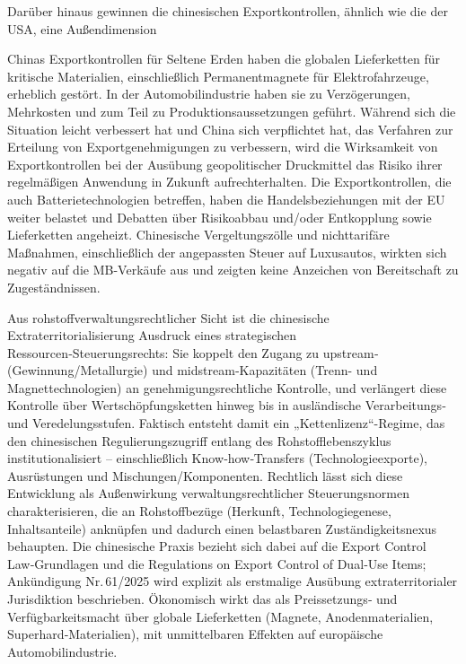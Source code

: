 \documentclass[12pt,a4paper,oneside]{book} %
\begin{document}
Darüber hinaus gewinnen die chinesischen Exportkontrollen, ähnlich wie die der USA, eine Außendimension

Chinas Exportkontrollen für Seltene Erden haben die globalen Lieferketten für kritische Materialien, einschließlich Permanentmagnete für Elektrofahrzeuge, erheblich gestört. In der Automobilindustrie haben sie zu Verzögerungen, Mehrkosten und zum Teil zu Produktionsaussetzungen geführt. Während sich die Situation leicht verbessert hat und China sich verpflichtet hat, das Verfahren zur Erteilung von Exportgenehmigungen zu verbessern, wird die Wirksamkeit von Exportkontrollen bei der Ausübung geopolitischer Druckmittel das Risiko ihrer regelmäßigen Anwendung in Zukunft aufrechterhalten. Die Exportkontrollen, die auch Batterietechnologien betreffen, haben die Handelsbeziehungen mit der EU weiter belastet und Debatten über Risikoabbau und/oder Entkopplung sowie Lieferketten angeheizt. Chinesische Vergeltungszölle und nichttarifäre Maßnahmen, einschließlich der angepassten Steuer auf Luxusautos, wirkten sich negativ auf die MB-Verkäufe aus und zeigten keine Anzeichen von Bereitschaft zu Zugeständnissen.

Aus rohstoffverwaltungsrechtlicher Sicht ist die chinesische Extraterritorialisierung Ausdruck eines strategischen Ressourcen‑Steuerungsrechts: Sie koppelt den Zugang zu upstream‑ (Gewinnung/Metallurgie) und midstream‑Kapazitäten (Trenn- und Magnettechnologien) an genehmigungsrechtliche Kontrolle, und verlängert diese Kontrolle über Wertschöpfungsketten hinweg bis in ausländische Verarbeitungs‑ und Veredelungsstufen.  Faktisch entsteht damit ein „Kettenlizenz“-Regime, das den chinesischen Regulierungszugriff entlang des Rohstofflebenszyklus institutionalisiert – einschließlich Know‑how‑Transfers (Technologieexporte), Ausrüstungen und Mischungen/Komponenten. Rechtlich lässt sich diese Entwicklung als Außenwirkung verwaltungsrechtlicher Steuerungsnormen charakterisieren, die an Rohstoffbezüge (Herkunft, Technologiegenese, Inhaltsanteile) anknüpfen und dadurch einen belastbaren Zuständigkeitsnexus behaupten. Die chinesische Praxis bezieht sich dabei auf die Export Control Law‑Grundlagen und die Regulations on Export Control of Dual‑Use Items; Ankündigung Nr. 61/2025 wird explizit als erstmalige Ausübung extraterritorialer Jurisdiktion beschrieben.  Ökonomisch wirkt das als Preissetzungs‑ und Verfügbarkeitsmacht über globale Lieferketten (Magnete, Anodenmaterialien, Superhard‑Materialien), mit unmittelbaren Effekten auf europäische Automobilindustrie.
\end{document}
